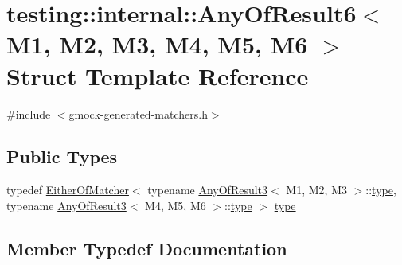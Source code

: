 \hypertarget{structtesting_1_1internal_1_1_any_of_result6}{}\section{testing\+:\+:internal\+:\+:Any\+Of\+Result6$<$ M1, M2, M3, M4, M5, M6 $>$ Struct Template Reference}
\label{structtesting_1_1internal_1_1_any_of_result6}


{\ttfamily \#include $<$gmock-\/generated-\/matchers.\+h$>$}

\subsection*{Public Types}
\begin{DoxyCompactItemize}
\item 
typedef \hyperlink{classtesting_1_1internal_1_1_either_of_matcher}{Either\+Of\+Matcher}$<$ typename \hyperlink{structtesting_1_1internal_1_1_any_of_result3}{Any\+Of\+Result3}$<$ M1, M2, M3 $>$\+::\hyperlink{structtesting_1_1internal_1_1_any_of_result6_a15837eb05d9ac5a76c20d344a4988dd1}{type}, typename \hyperlink{structtesting_1_1internal_1_1_any_of_result3}{Any\+Of\+Result3}$<$ M4, M5, M6 $>$\+::\hyperlink{structtesting_1_1internal_1_1_any_of_result6_a15837eb05d9ac5a76c20d344a4988dd1}{type} $>$ \hyperlink{structtesting_1_1internal_1_1_any_of_result6_a15837eb05d9ac5a76c20d344a4988dd1}{type}
\end{DoxyCompactItemize}


\subsection{Member Typedef Documentation}
\mbox{\label{structtesting_1_1internal_1_1_any_of_result6_a15837eb05d9ac5a76c20d344a4988dd1}} 
